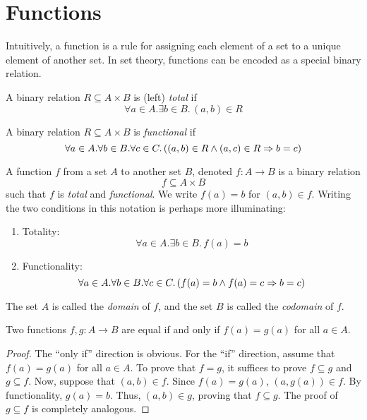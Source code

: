 \documentclass{amsart}
\begin{document}
\section{Functions}
\label{sec:functions}

Intuitively, a function is a rule for assigning each element of a set to a unique element of another set.
In set theory, functions can be encoded as a special binary relation.

\begin{defn}
  A binary relation $R \subseteq A \times B$ is (left) \emph{total} if
  \[
    \forall a \in A.\exists b \in B.\,(a,b) \in R
  \]
\end{defn}

\begin{defn}
  A binary relation $R \subseteq A \times B$ is \emph{functional} if
  \[
    \forall a \in A.\forall b \in B.\forall c \in C.\,((a,b) \in R \wedge (a,c) \in R \Rightarrow b = c)
  \]
\end{defn}

\begin{defn}
  A function $f$ from a set $A$ to another set $B$, denoted $f : A \to B$ is a binary relation
  \[
    f \subseteq A \times B
  \]
  such that $f$ is \emph{total} and \emph{functional}.
  We write $f(a) = b$ for $(a,b) \in f$.
  Writing the two conditions in this notation is perhaps more illuminating:
  \begin{enumerate}
  \item Totality:
    \[
      \forall a \in A.\exists b \in B.\,f(a) = b
    \]
  \item Functionality:
    \[
      \forall a \in A.\forall b \in B.\forall c \in C.\,(f(a) = b \wedge f(a) = c \Rightarrow b = c)
    \]
  \end{enumerate}
  The set $A$ is called the \emph{domain} of $f$, and the set $B$ is called the \emph{codomain} of $f$.
\end{defn}

\begin{thm}
  Two functions $f,g : A \to B$ are equal if and only if $f(a) = g(a)$ for all $a \in A$.
\end{thm}
\begin{proof}
  The ``only if'' direction is obvious.
  For the ``if'' direction, assume that $f(a) = g(a)$ for all $a \in A$.
  To prove that $f = g$, it suffices to prove $f \subseteq g$ and $g \subseteq f$.
  Now, suppose that $(a,b) \in f$.
  Since $f(a) = g(a)$, $(a, g(a)) \in f$.
  By functionality, $g(a) = b$.
  Thus, $(a,b) \in g$, proving that $f \subseteq g$.
  The proof of $g \subseteq f$ is completely analogous.
\end{proof}
\end{document}
